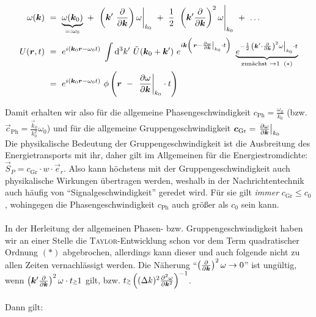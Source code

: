 \begin{align*}
\omega(\vec{k}) \ &= \ \underbrace{\omega(\vec{k}_0)}_{=:\omega_0} \ + \ \left.\left(\vec{k}' \ \pdiff{}{\vec{k}}\right)\omega\right|_{k_0} \ + \ \frac{1}{2} \ \left.\left(\vec{k}'\pdiff{}{\vec{k}}\right)^2\omega\right|_{k_0} \ + \ \ldots\\
U(\vec{r},t)  \ &= \ e^{i(\vec{k}_0\vec{r}-\omega_0 t)} \; \int\d^3 k' \ \tilde{U}(\vec{k}_0 + \vec{k}') \ e^{i\vec{k}\left(\left.\vec{r}-\pdiff{\omega}{\vec{k}}\right|_{k_0} \cdot t\right)} \ \underbrace{e^{-\frac{1}{2}\left.\left(\vec{k}' \cdot \pdiff{}{\vec{k}}\right)^2\omega\right|_{k_0} \cdot t}}_{\text{zunächst } \rightarrow 1 \; \; (*)}\\
&= \ e^{i(\vec{k}_0\vec{r} - \omega_0 t)} \ \phi\left(\vec{r} \ - \ \left.\pdiff{\omega}{\vec{k}}\right|_{k_0} \cdot t \right)
\end{align*}

Damit erhalten wir also für die allgemeine Phasengeschwindigkeit $c_{\text{Ph}} = \frac{\omega_0}{k_0}$ (bzw. $\vec{c}_{\text{Ph}} = \frac{\vec{k}_0}{k_0^2}\omega_0$) und für die allgemeine Gruppengeschwindigkeit $\bm{c}_{\text{Gr}} = \left.\frac{\partial{\omega}}{\partial{\bm{k}}}\right|_{k_0}$\\
Die physikalische Bedeutung der Gruppengeschwindigkeit ist die Ausbreitung des Energietransports mit ihr, daher gilt im Allgemeinen für die Energiestromdichte: $\vec{S}_P = c_{\text{Gr}} \cdot w \cdot \vec{e}_r$. Also kann höchstens mit der Gruppengeschwindigkeit auch physikalische Wirkungen übertragen werden, weshalb in der Nachrichtentechnik auch häufig von "`Signalgeschwindigkeit"' geredet wird. Für sie gilt \emph{immer} $c_{\text{Gr}} \leq c_0$, wohingegen die Phasengeschwindigkeit $c_{\text{Ph}}$ auch größer als  $c_0$ sein kann.\\ 
\ \\
In der Herleitung der allgemeinen Phasen- bzw. Gruppengeschwindigkeit haben wir an einer Stelle die \textsc{Taylor}-Entwicklung schon vor dem Term quadratischer Ordnung $(*)$ abgebrochen, allerdings kann dieser und auch folgende nicht zu allen Zeiten vernachlässigt werden. Die Näherung "`$\left(\frac{\partial{}}{\partial{\bm{k}}}\right)^2\omega\rightarrow 0$"' ist ungültig, wenn $\left(\vec{k}'\pdiff{}{\vec{k}}\right)^2\omega \cdot t \mathsmaller{\mathsmaller{\gtrsim}} 1$ gilt, bzw. $t \mathsmaller{\mathsmaller{\gtrsim}} \left((\Delta k)^2 \pddiff{\omega}{\vec{k}}\right)^{-1}$.\\
\ \\
Dann gilt:\\


